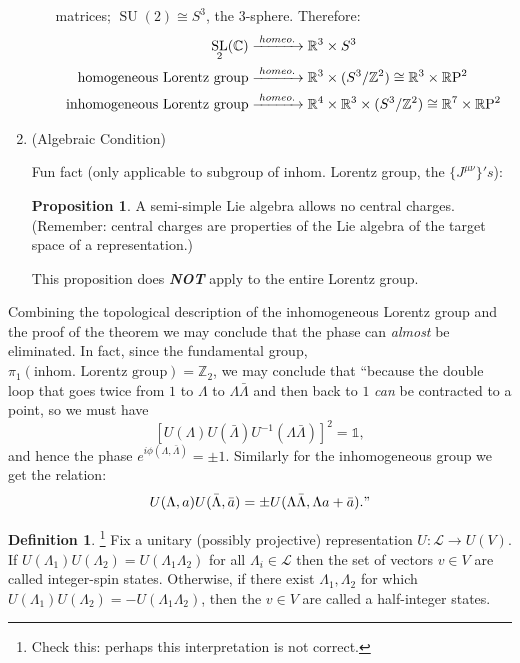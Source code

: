 \documentclass[10pt]{article}
\newcommand{\iden}{\mathds{1}}
\newcommand{\bZ}{\mathbb Z}
\newcommand{\bR}{\mathbb{R}}
\newcommand{\bC}{\mathbb{C}}
\newcommand{\ms}{\mathscr}
\theoremstyle{plain}
\theoremstyle{definition}
\newtheorem{defn}{Definition}
\newtheorem{prop}{Proposition}
\theoremstyle{remark}
\DeclareMathOperator{\SL}{SL}
\DeclareMathOperator{\SU}{SU}
\begin{document}
\begin{enumerate}
\begin{enumerate}
                matrices; $\SU(2)\cong S^3$, the 3-sphere.  Therefore:
                \begin{align*}
                \SL_2(\bC)&\xrightarrow{\;homeo.\;}\bR^3\times S^3\\
\text{homogeneous Lorentz group}&\xrightarrow{\;homeo.\;}
    \bR^3\times (S^3/\bZ^2) \cong \bR^3\times \bR\rm P^2\\
\text{inhomogeneous Lorentz group}&\xrightarrow{\;homeo.\;}
   \bR^4 \times \bR^3\times (S^3/\bZ^2) \cong \bR^7\times \bR\rm P^2\\
                \end{align*}
        \end{enumerate}

    \item (Algebraic Condition)

        Fun fact (only applicable to subgroup of inhom. Lorentz
        group, the $\{J^{\mu\nu}\}'s$):
        \begin{prop}
            A semi-simple Lie algebra allows no central charges.
            (Remember: central charges are properties of the Lie
            algebra of the target space of a representation.)
        \end{prop}
        This proposition does \textbf{\emph{NOT}} apply to the entire
        Lorentz group.
\end{enumerate}

Combining the topological description of the inhomogeneous Lorentz
group and the proof of the theorem we may conclude that the phase can
\emph{almost} be eliminated. In fact, since the fundamental
group, $\pi_1(\text{inhom.  Lorentz group}) = \bZ_2$, we may conclude
that ``because the double loop that goes twice from $1$ to $\Lambda$
to $\Lambda\bar\Lambda$ and then back to $1$ \emph{can} be contracted
to a point, so we must have \[\left[ U(\Lambda)U(\bar\Lambda)
U^{-1}(\Lambda\bar\Lambda)\right]^2 = \iden,\] and hence the phase
$e^{i\phi(\Lambda,\bar\Lambda)} = \pm1$.  Similarly for the
inhomogeneous group we get the relation: 
\begin{align}
    U(\Lambda,a)U(\bar\Lambda,\bar a) = \pm
    U(\Lambda\bar\Lambda,\Lambda a+\bar a)."
    \label{eqn:superselectionrestriction}
\end{align}

\begin{defn}
    \footnote{Check this: perhaps this interpretation is not correct.}
    Fix a unitary (possibly projective) representation $U:\ms
    L \to U(V)$. If $U(\Lambda_1)U(\Lambda_2) =
    U(\Lambda_1\Lambda_2)$ for all $\Lambda_i\in\ms L$ then the set of
    vectors $v\in V$ are called integer-spin states. Otherwise, if
    there exist $\Lambda_1,\Lambda_2$ for which $U(\Lambda_1)
    U(\Lambda_2) = -U(\Lambda_1\Lambda_2)$, then the $v\in V$ are
    called a half-integer states.
\end{defn}
\end{document}

